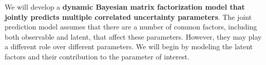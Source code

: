 \documentclass[12pt]{article}
\begin{document}


We will develop a {\bf dynamic Bayesian matrix factorization model that jointly predicts multiple correlated uncertainty parameters}. The joint prediction model assumes that there are a number of common factors, including both observable and latent, that affect these parameters. However, they may play a different role over different parameters. We will begin by modeling the latent factors and their contribution to the parameter of interest.

\end{document}
